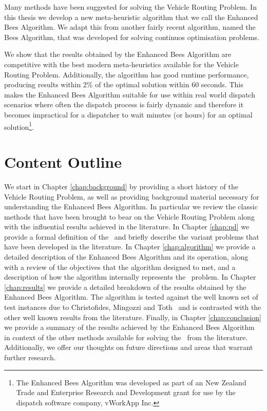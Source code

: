 Many methods have been suggested for solving the Vehicle Routing Problem. In this thesis we develop a new meta-heuristic algorithm that we call the Enhanced Bees Algorithm. We adapt this from another fairly recent algorithm, named the Bees Algorithm, that was developed for solving continuos optimisation problems.

We show that the results obtained by the Enhanced Bees Algorithm are competitive with the best modern meta-heuristics available for the Vehicle Routing Problem. Additionally, the algorithm has good runtime performance, producing results within 2\% of the optimal solution within 60 seconds. This makes the Enhanced Bees Algorithm suitable for use within real world dispatch scenarios where often the dispatch process is fairly dynamic and therefore it becomes impractical for a dispatcher to wait minutes (or hours) for an optimal solution\footnote{The Enhanced Bees Algorithm was developed as part of an New Zealand Trade and Enterprise Research and Development grant for use by the dispatch software company, vWorkApp Inc.}.

\section{Content Outline}

We start in Chapter \ref{chap:background} by providing a short history of the Vehicle Routing Problem, as well as providing background material necessary for understanding the Enhanced Bees Algorithm. In particular we review the classic methods that have been brought to bear on the Vehicle Routing Problem along with the influential results achieved in the literature. In Chapter \ref{chap:pd} we provide a formal definition of the \VRP\ and briefly describe the variant problems that have been developed in the literature. In Chapter \ref{chap:algorithm} we provide a detailed description of the Enhanced Bees Algorithm and its operation, along with a review of the objectives that the algorithm designed to met, and a description of how the algorithm internally represents the \VRP\ problem. In Chapter \ref{chap:results} we provide a detailed breakdown of the results obtained by the Enhanced Bees Algorithm. The algorithm is tested against the well known set of test instances due to Christofides, Mingozzi and Toth~\cite{CMT:1981} and is contrasted with the other well known results from the literature. Finally, in Chapter \ref{chap:conclusion} we provide a summary of the results achieved by the Enhanced Bees Algorithm in context of the other methods available for solving the \VRP\ from the literature. Additionally, we offer our thoughts on future directions and areas that warrant further research.  




 

